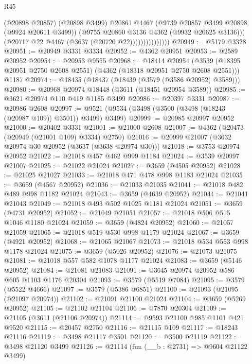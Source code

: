 \begin{lexlean}{R45}
\begin{coremodule}
                              (@20898 @20857)
                              (@20898 @3499)
                              @20861
                              @4467
                              (@9739 @20857 @3499 @20898 (@9924 @20611 @3499))
                              (@9755 @20860 @3136 @4362 (@9932 @20625 @3136)))
                            (@20717 @22 @4467 (@3637 (@20720 @22)))))))))))))))
@20949 := @5179 @3328
@20951 := @20949 @3331 @3334
@20952 := @4362 @20951
@20953 := @2589 @20952
@20954 := @20953 @9555
@20968 := @18414
    @20954
    (@3539 (@18395 @20951 @2750 @2608 @2551) (@4362 (@18318 @20951 @2750 @2608 @2551)))
    @1187
@20974 := @18435 (@18437 (@18439 (@3579 (@3586 @20952) @3589)))
@20980 := @20968 @20974 @18448 (@3611 (@18451 @20954 @3589))
@20985 := @3621 @20974 @110 @419 @1185 @3499
@20986 := @20397 @3331
@20987 := @20986 @2608
@20997 := @9521 (@9534 (@3498 (@3500 (@3498 (@18243 (@20987 @109)) @3501)) @3499) @3499)
@20999 := @20985 @20997 @20952
@21000 := @20402 @3331
@21001 := @21000 @2608
@21007 := @4362 (@20473 (@20949 (@21001 @109) @3334) @2750)
@21016 := @20999 @21007 (@3632 @20974 @30 @20952 (@3637 (@3638 @20974 @30)))
@21018 := @3753 @20974 @20952
@21022 := @21018 @457 @462 @999 @1184
@21024 := @3539 @20997 @21007
@21025 := @21022 @21024
@21027 := @3659 (@4505 @20952)
@21028 := @21025 @21027
@21033 := @21018 @471 @478 @998 @1183 @21024
@21035 := @3659 (@4567 @20952)
@21036 := @21033 @21035
@21041 := @21018 @482 @489 @998 @1182 @21024
@21043 := @3659 (@4639 @20952)
@21044 := @21041 @21043
@21049 := @21018 @493 @502 @1025 @1181 @21024
@21051 := @3659 (@4731 @20952)
@21052 := @21049 @21051
@21057 := @21018 @506 @515 @1046 @1180 @21024
@21059 := @3659 (@4824 @20952)
@21060 := @21057 @21059
@21065 := @21018 @519 @530 @998 @1179 @21024
@21067 := @3659 (@4921 @20952)
@21068 := @21065 @21067
@21073 := @21018 @534 @553 @998 @1178 @21024
@21075 := @3659 (@5026 @20952)
@21076 := @21073 @21075
@21081 := @21018 @557 @582 @1078 @1177 @21024
@21083 := @3659 (@5146 @20952)
@21084 := @21081 @21083
@21091 := @3645 @20974 @20952 @586 @605 @1103 @1176 @20304
@21093 := @3579 (@5519 @7084)
@21095 := @3579 (@5522 @4666)
@21097 := @3579 (@5386 @6851)
@21100 := @21093 (@21095 (@21097 @20974))
@21102 := @21091 @21100 @21024
@21104 := @3659 (@5269 @20952)
@21105 := @21102 @21104
@21106 := @7870 @20304
@21109 := @21105 (@3611 (@21106 @20974))
@21114 := @9593 @21100 @985 @1101 @421 @9520
@21115 := @20457 @2750
@21116 := @21115 @109
@21117 := @18243 @21116
@21119 := @3498 @21117 @3501
@21120 := @3500 @21119
@21122 := @3498 @21120 @3499
@21126 := @21114 (fun (__b : @2731) => @9604 @21122 @3499)

\end{coremodule}
\end{lexlean}
